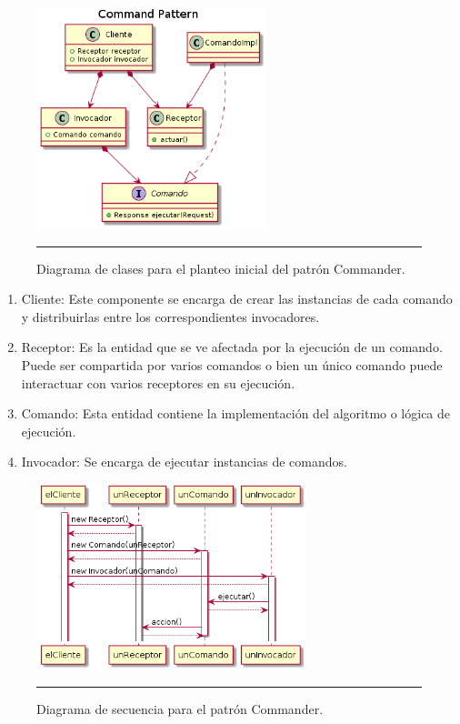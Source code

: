 \begin{figure}[htbp]
	\centering
	\includegraphics[width=0.6\textwidth]{Figures/uml_clases_commander.png}
	\rule{35em}{1pt}
	\caption[Commander Classes]{Diagrama de clases para el planteo inicial del patrón Commander.}
	\label{fig:uml_clases_commander}
\end{figure}

\begin{enumerate}
	\item Cliente: Este componente se encarga de crear las instancias de cada comando y distribuirlas entre los correspondientes invocadores.
	\item Receptor: Es la entidad que se ve afectada por la ejecución de un comando. Puede ser compartida por varios comandos o bien un único comando puede interactuar con varios receptores en su ejecución.
	\item Comando: Esta entidad contiene la implementación del algoritmo o lógica de ejecución.
	\item Invocador: Se encarga de ejecutar instancias de comandos.
\end{enumerate}

\begin{figure}[htbp]
	\centering
	\includegraphics[width=0.7\textwidth]{Figures/uml_sequence_commander.png}
	\rule{35em}{1pt}
	\caption[MVP Components]{Diagrama de secuencia para el patrón Commander.}
	\label{fig:uml_commander_sequence}
\end{figure}

